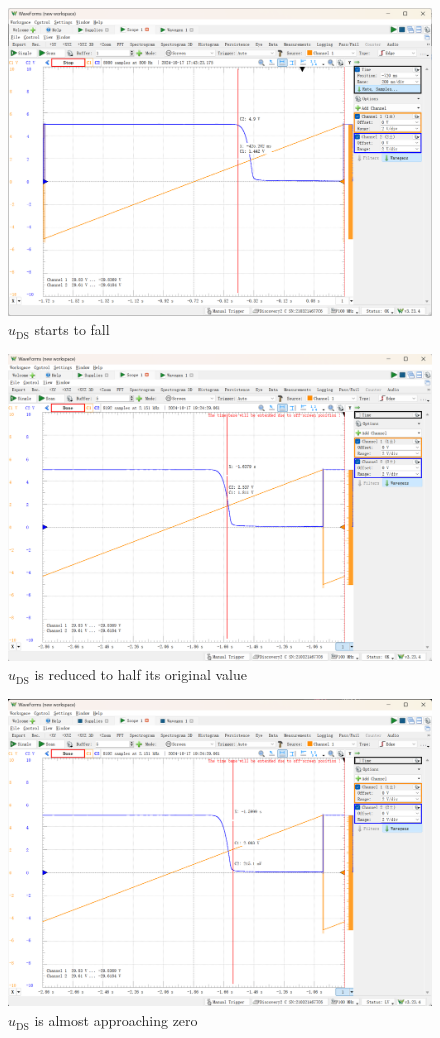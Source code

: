 \documentclass[UTF8]{report}
\theoremstyle{MyLineTheoremStyle} %
\theoremstyle{MyBlockTheoremStyle} %
\theoremstyle{MySubsubsectionStyle} %
\begin{document}
\begin{figure}[H]\centering
\includegraphics[width=0.85\columnwidth]{assets/Lab1/5fe0d6c923f598052f8d5dd66829ef48.png}
\caption{$u_{\text{DS}}$ starts to fall}
\end{figure}
\begin{figure}[H]\centering
\includegraphics[width=0.85\columnwidth]{assets/Lab1/86cb72928caa02d6d52099c81652c080.png}
\caption{$u_{\text{DS}}$ is reduced to half its original value}
\end{figure}
\begin{figure}[H]\centering
\includegraphics[width=0.85\columnwidth]{assets/Lab1/572997193238edd36d4146fe759619af.png}
\caption{$u_{\text{DS}}$ is almost approaching zero}
\end{figure}
\end{document}
